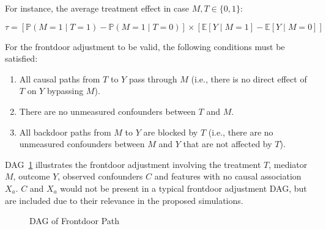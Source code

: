 \documentclass{article}
\numberwithin{equation}{section}
\begin{document}
For instance, the average treatment effect in case $M, T \in \{0, 1\}$:

\begin{equation}
\tau = \left[ \mathbb{P}(M = 1 \mid T = 1) - \mathbb{P}(M = 1 \mid T = 0) \right] \times \left[ \mathbb{E}[Y \mid M = 1] - \mathbb{E}[Y \mid M = 0] \right]
\end{equation}

For the frontdoor adjustment to be valid, the following conditions must be satisfied:

\begin{enumerate}
\item All causal paths from $T$ to $Y$ pass through $M$ (i.e., there is no direct effect of $T$ on $Y$ bypassing $M$).
\item There are no unmeasured confounders between $T$ and $M$.
\item All backdoor paths from $M$ to $Y$ are blocked by $T$ (i.e., there are no unmeasured confounders between $M$ and $Y$ that are not affected by $T$).
\end{enumerate}

DAG~\ref{fig:dag_frontdoor_path} illustrates the frontdoor adjustment involving the treatment $T$, mediator $M$, outcome $Y$, observed confounders $C$ and features with no causal association $X_a$. $C$ and $X_a$ would not be present in a typical frontdoor adjustment DAG, but are included due to their relevance in the proposed simulations.

\begin{figure}[H]
    \centering
    \caption{DAG of Frontdoor Path}
    \label{fig:dag_frontdoor_path}
\end{figure}
\end{document}
